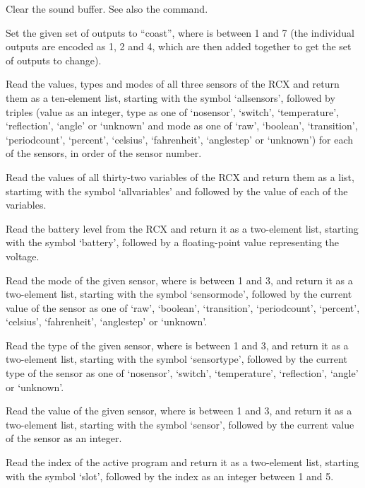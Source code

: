   Clear the sound buffer.
  See also the  command.
  
  Set the given set of outputs to ``coast'', where  is between 1 and 7
  (the individual outputs are encoded as 1, 2 and 4, which are then added together to get the set of outputs to change).
  
  Read the values, types and modes of all three sensors of the RCX and return them as a ten-element list, starting with the
  symbol `allsensors', followed by triples (value as an integer, type as one of `nosensor', `switch', `temperature', `reflection',
  `angle' or `unknown' and mode as one of `raw', `boolean', `transition', `periodcount', `percent', `celsius', `fahrenheit',
  `anglestep' or `unknown') for each of the sensors, in order of the sensor number.
  
  Read the values of all thirty-two variables of the RCX and return them as a list, startimg with the
  symbol `allvariables' and followed by the value of each of the variables.
  
  Read the battery level from the RCX and return it as a two-element list, starting with the symbol `battery', followed
  by a floating-point value representing the voltage.
  
  Read the mode of the given sensor, where  is between 1 and 3, and return it as a two-element list,
  starting with the symbol `sensormode', followed by the current value of the sensor as one of `raw', `boolean', `transition', `periodcount', `percent', `celsius', `fahrenheit',
  `anglestep' or `unknown'.
  
  Read the type of the given sensor, where  is between 1 and 3, and return it as a two-element list,
  starting with the symbol `sensortype', followed by the current type of the sensor as one of `nosensor', `switch', `temperature',
  `reflection', `angle' or `unknown'.
  
  Read the value of the given sensor, where  is between 1 and 3, and return it as a two-element list,
  starting with the symbol `sensor', followed by the current value of the sensor as an integer.
  
  Read the index of the active program and return it as a two-element list, starting with the symbol `slot', followed
  by the index as an integer between 1 and 5.
  
